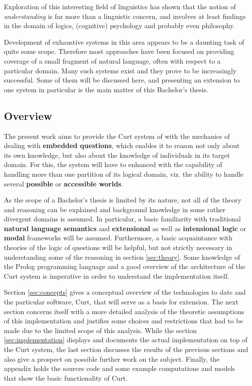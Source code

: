 \documentclass[a4paper]{article}
\newcommand{\term}[1]{\textsf{\textbf{#1}}} %
\newcommand{\pn}{\textsf} %
\newcommand{\curt}{\pn{Curt}}
\newcommand{\prol}{\pn{Prolog}}
\theoremstyle{remark}
\theoremstyle{remark}
\theoremstyle{definition}
\theoremstyle{definition}
\begin{document}
Exploration of this  interesting field of linguistics has shown that
the notion of \emph{understanding} is far more than a linguistic concern, and
involves at least findings in the domain of logics, (cognitive) psychology and
probably even philosophy.

Development of exhaustive systems in this area appears to be a daunting task of
quite some scope. Therefore most approaches have been focused on providing
coverage of a small fragment of natural language, often with respect to a
particular domain. Many such systems exist and they prove to be increasingly
successful. Some of them will be discussed here, and presenting an extension to
one system in particular is the main matter of this Bachelor's thesis.

\subsection{Overview}

The present work aims to provide the \curt{} system of
\cite{blackburnbos:cl1} with the mechanics of dealing with \term{embedded
questions}, which enables it to reason not only about its own knowledge, but
also about the knowledge of individuals in its target domain.
For this, the system will have to enhanced with the capability of handling more
than one partition of its logical domain, viz. the ability to handle several
\term{possible} or \term{accessible worlds}.

As the scope of a Bachelor's thesis is limited by its nature, not all of the
theory and reasoning can be explained and background knowledge in some rather
divergent domains is assumed. In particular, a basic familiarity with
traditional \term{natural language semantics} and \term{extensional} as well as
\term{intensional logic} or \term{modal} frameworks will be assumed.
Furthermore, a basic acquaintance with theories of the logic of questions will be helpful,
but not strictly necessary in understanding some of the reasoning in section
\ref{sec:theory}.  Some knowledge of the \prol{} programming language and a good
overview of the architecture of the \curt{} system is imperative in order to
understand the implementation itself.

Section \ref{sec:concepts}  gives a conceptual overview of the technologies to
date and the particular software, \curt, that will serve as a basis for
extension.  The next section concerns itself with a more detailed analysis of
the theoretic assumptions of this implementation and justifies some choices and
restrictions that had to be made due to the limited scope of this analysis.
While the section \ref{sec:implementation} displays and documents the actual
implementation on top of the \curt{} system, the last section discusses the
results of the previous sections and also give a prospect on possible further work on the
subject. Finally, the appendix holds the sources code and some example
computations and models that show the basic functionality of \curt.
\end{document}

